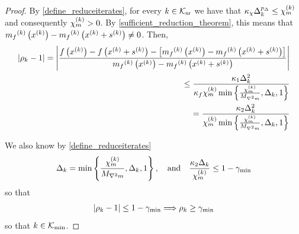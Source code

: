 \begin{proof}
By \cref{define_reduceiterates}, for every $k \in {\mathcal K_{\textrm{sr}}}$ we have that $\kappa_{\chi}\Delta_k^{p_{\Delta}} \le {\chi_m^{(k)}}$ and consequently ${\chi_m^{(k)}} > 0$.
By \cref{sufficient_reduction_theorem}, this means that ${{m}_f}^{(k)}\left(x^{(k)}\right) - {{m}_f}^{(k)}\left(x^{(k)} + {{s}^{(k)}}\right) \ne 0$.
Then,
\begin{align*}
\left|\rho_k - 1\right| 
= \left|\frac
{f\left(x^{(k)}\right) - f\left(x^{(k)} + {{s}^{(k)}}\right) - \left[{{m}_f}^{(k)}\left(x^{(k)}\right) - {{m}_f}^{(k)}\left(x^{(k)} + {{s}^{(k)}}\right)\right]}
{{{m}_f}^{(k)}\left(x^{(k)}\right) - {{m}_f}^{(k)}\left(x^{(k)} + {{s}^{(k)}}\right)} \right| \\
\le \frac {{\kappa_1} \Delta_k^2} {\kappa_f {\chi_m^{(k)}} \min\left\{\frac{{\chi_m^{(k)}}}{{M_{\nabla^2 m}}}, \Delta_k, 1\right\}} \\
= \frac {{\kappa_2} \Delta_k^2} {{\chi_m^{(k)}} \min\left\{\frac{{\chi_m^{(k)}}}{{M_{\nabla^2 m}}}, \Delta_k, 1\right\}}
\end{align*}

We also know by \cref{define_reduceiterates}
\begin{align*}
\Delta_k = \min\left\{\frac {{\chi_m^{(k)}}} {{M_{\nabla^2 m}}}, \Delta_k, 1 \right\}, \quad \textrm{and} \quad
\frac {{\kappa_2} \Delta_k}{{\chi_m^{(k)}}} \le 1 - \gamma_{\textrm{min}}
\end{align*}
so that
\begin{align*}
\left|\rho_k - 1\right| \le 1 - \gamma_{\textrm{min}}
\Longrightarrow \rho_k \ge \gamma_{\textrm{min}}
\end{align*}
so that $k \in {\mathcal K_{\textrm{min}}}$.
\end{proof}


% 


